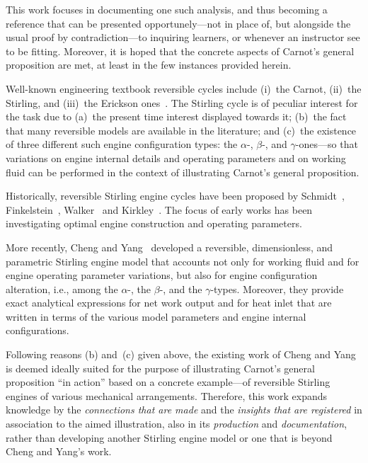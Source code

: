     This work focuses in documenting one such analysis, and thus becoming a reference  that  can
    be  presented  opportunely---not  in  place  of,  but   alongside   the   usual   proof   by
    contradiction---to inquiring  learners,  or  whenever  an  instructor  see  to  be  fitting.
    Moreover, it is hoped that the concrete aspects of Carnot's general proposition are met,  at
    least in the few instances provided herein.

    Well-known engineering textbook reversible cycles include (i)~the Carnot, (ii)~the Stirling,
    and (iii)~the Erickson  ones~\cite{2013-CengelYA+BolesMA-AMGH}.  The  Stirling  cycle  is  of
    peculiar interest for the task due to (a)~the present time interest  displayed  towards  it;
    (b)~the fact that many reversible models  are  available  in  the  literature;  and  (c)~the
    existence of three different such engine configuration types: the $\alpha$-,  $\beta$-,  and
    $\gamma$-ones---so that variations on engine internal details and operating  parameters  and
    on working  fluid  can  be  performed  in  the  context  of  illustrating  Carnot's  general
    proposition.

    Historically,   reversible    Stirling    engine    cycles    have    been    proposed    by
    Schmidt~\cite{1871-SchmidtG-ZeitVerDeutschIng},
    Finkelstein~\cite{1960-FinkelsteinT-SAEIntl},   Walker~\cite{1962-WalkerG-JMechEngSci}   and
    Kirkley~\cite{1962-KirkleyDW-JMechEngSci}. The focus of early works has  been  investigating
    optimal engine construction and operating parameters.

    More recently, Cheng and Yang~\cite{2012-ChengCH+YangHS-ApEnergy}  developed  a  reversible,
    dimensionless, and parametric Stirling engine model that accounts not only for working fluid
    and for engine operating parameter variations, but also for engine configuration alteration,
    i.e., among the $\alpha$-, the $\beta$-, and  the  $\gamma$-types.  Moreover,  they  provide
    exact analytical expressions for net work output and for heat  inlet  that  are  written  in
    terms of the various model parameters and engine internal configurations.

    Following  reasons  (b)  and~(c)   given   above,   the   existing   work   of   Cheng   and
    Yang~\cite{2012-ChengCH+YangHS-ApEnergy}  is  deemed  ideally  suited  for  the  purpose  of
    illustrating Carnot's general proposition ``in action'' based  on  a  concrete  example---of
    reversible Stirling engines of various mechanical arrangements. Therefore, this work expands
    knowledge  by  the  \emph{connections  that  are  made}  and  the  \emph{insights  that  are
    registered} in association to the aimed illustration,  also  in  its  \emph{production}  and
    \emph{documentation}, rather than developing another Stirling engine model or  one  that  is
    beyond Cheng and Yang's work.


